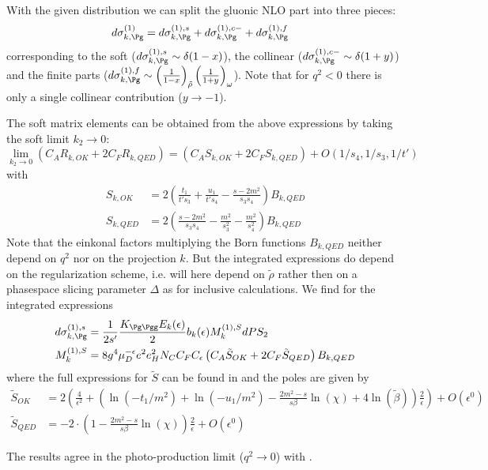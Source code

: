 With the given distribution we can split the gluonic NLO part into three pieces\cite{Harris:1995tu}:
\begin{align}
d\sigma_{k,\Pg}^{(1)} &= d\sigma_{k,\Pg}^{(1),s} + d\sigma_{k,\Pg}^{(1),c-} + d\sigma_{k,\Pg}^{(1),f}
\end{align}
corresponding to the soft ($d\sigma_{k,\Pg}^{(1),s} \sim \delta(1-x)$), the collinear ($d\sigma_{k,\Pg}^{(1),c-} \sim \delta(1+y)$) and the finite parts ($d\sigma_{k,\Pg}^{(1),f} \sim \left(\frac 1 {1-x}\right)_{\tilde \rho}\left(\frac 1 {1+y}\right)_{\omega}$). Note that for $q^2 < 0$ there is only a single collinear contribution ($y\rightarrow -1$).

The soft matrix elements can be obtained from the above expressions by taking the soft limit $k_2\rightarrow 0$:
\begin{equation}
\lim_{k_2\rightarrow 0}\left(C_A R_{k,OK} + 2C_F R_{k,QED}\right) = \left(C_A S_{k,OK} + 2C_F S_{k,QED}\right) + O(1/s_4,1/s_3,1/t')
\end{equation}
with
\begin{align}
S_{k,OK}  &= 2\left(\frac{t_1}{t's_3} + \frac{u_1}{t's_4}-\frac{s-2m^2}{s_3s_4}\right)B_{k,QED}\\
S_{k,QED} &= 2\left(\frac{s-2m^2}{s_3s_4} - \frac{m^2}{s_3^2} - \frac{m^2}{s_4^2}\right)B_{k,QED}
\end{align}
Note that the einkonal factors multiplying the Born functions $B_{k,QED}$ neither depend on $q^2$ nor on the projection $k$. But the integrated expressions do depend on the regularization scheme, i.e. will here depend on $\tilde\rho$ rather then on a phasespace slicing parameter $\Delta$ as for inclusive calculations\cite{Laenen1993162}. We find for the integrated expressions
\begin{align}
d\sigma_{k,\Pg}^{(1),s} &= \frac 1 {2s'}\frac {K_{\Pg\Pgg}E_k(\epsilon)} 2  b_k(\epsilon) M_k^{(1),S} dPS_2\\
M_k^{(1),S} &= 8g^4\mu_D^{-\epsilon}e^2e_H^2 N_C C_F C_\epsilon\left( C_A \tilde S_{OK} + 2C_F \tilde S_{QED}\right) B_{k,QED}
\end{align}
where the full expressions for $\tilde S$ can be found in \cite{Harris:1995tu} and the poles are given by
\begin{align}
\tilde S_{OK} &= 2\left(\frac 4 {\epsilon^2} + \left(\ln(-t_1/m^2) + \ln(-u_1/m^2) - \frac{2m^2-s}{s\beta}\ln(\chi) + 4\ln(\tilde\beta)\right)\frac 2 {\epsilon}\right) + O(\epsilon^0)\\
\tilde S_{QED} &=-2\cdot \left(1 - \frac{2m^2-s}{s\beta}\ln(\chi)\right)\frac 2 \epsilon + O(\epsilon^0)
\end{align}

The results agree in the photo-production limit ($q^2\rightarrow 0$) with \cite{Bojak:1998zm}.
